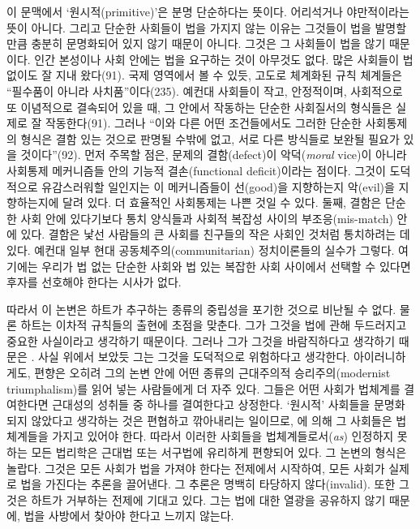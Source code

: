 이 문맥에서 ‘원시적(primitive)’은 분명 단순하다는 뜻이다. 어리석거나
야만적이라는 뜻이 아니다. 그리고 단순한 사회들이 법을 가지지 않는 이유는
그것들이 법을 발명할 만큼 충분히 문명화되어 있지 않기 때문이 아니다.
그것은 그 사회들이 법을  않기 때문이다. 인간
본성이나 사회 안에는 법을 요구하는 것이 아무것도 없다. 많은 사회들이 법
없이도 잘 지내 왔다(91). 국제 영역에서 볼 수 있듯, 고도로 체계화된 규칙
체계들은 “필수품이 아니라 사치품”이다(235). 예컨대 사회들이 작고,
안정적이며, 사회적으로 또 이념적으로 결속되어 있을 때, 그 안에서
작동하는 단순한 사회질서의 형식들은 실제로 잘 작동한다(91). 그러나
“이와 다른 어떤 조건들에서도 그러한 단순한 사회통제의 형식은 결함 있는
것으로 판명될 수밖에 없고, 서로 다른 방식들로 보완될 필요가 있을
것이다”(92). 먼저 주목할 점은, 문제의 결함(defect)이 
악덕(\emph{moral} vice)이 아니라 사회통제 메커니즘들 안의 기능적
결손(functional deficit)이라는 점이다. 그것이 도덕적으로 유감스러워할
일인지는 이 메커니즘들이 선(good)을 지향하는지 악(evil)을 지향하는지에
달려 있다. 더 효율적인 사회통제는 나쁜 것일 수 있다. 둘째, 결함은 단순한
사회 안에 있다기보다 통치 양식들과 사회적 복잡성 사이의
부조응(mis-match) 안에 있다. 결함은 낯선 사람들의 큰 사회를 친구들의
작은 사회인 것처럼 통치하려는 데 있다. 예컨대 일부 현대
공동체주의(communitarian) 정치이론들의 실수가 그렇다. 여기에는 우리가 법
없는 단순한 사회와 법 있는 복잡한 사회 사이에서 선택할 수 있다면 후자를
선호해야 한다는 시사가 없다.

따라서 이 논변은 하트가 추구하는 종류의 중립성을 포기한 것으로 비난될 수
없다. 물론 하트는 이차적 규칙들의 출현에 초점을 맞춘다. 그가 그것을 법에
관해 두드러지고 중요한 사실이라고 생각하기 때문이다. 그러나 그가 그것을
바람직하다고 생각하기 때문은 . 사실 위에서 보았듯 그는
그것을 도덕적으로 위험하다고 생각한다. 아이러니하게도, 편향은 오히려
그의 논변 안에 어떤 종류의 근대주의적 승리주의(modernist triumphalism)를
읽어 넣는 사람들에게 더 자주 있다. 그들은 어떤 사회가 법체계를
결여한다면 근대성의 성취들 중 하나를 결여한다고 상정한다. ‘원시적’
사회들을 문명화되지 않았다고 생각하는 것은 편협하고 깎아내리는 일이므로,
에 의해 그 사회들은 법체계들을 가지고
있어야 한다. 따라서 이러한 사회들을 법체계들로서(\emph{as}) 인정하지
못하는 모든 법리학은 근대법 또는 서구법에 유리하게 편향되어 있다. 그
논변의 형식은 놀랍다. 그것은 모든 사회가 법을 가져야 한다는 전제에서
시작하여, 모든 사회가 실제로 법을 가진다는 추론을 끌어낸다. 그 추론은
명백히 타당하지 않다(invalid). 또한 그것은 하트가 거부하는 전제에 기대고
있다. 그는 법에 대한 열광을 공유하지 않기 때문에, 법을 사방에서 찾아야
한다고 느끼지 않는다.

